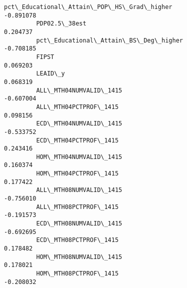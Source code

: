 \documentclass[11pt]{article}
\begin{document}
\begin{Verbatim}[commandchars=\\\{\}]
         pct\_Educational\_Attain\_POP\_HS\_Grad\_higher                    -0.891078   
         PDP02.5\_38est                                                 0.204737   
         pct\_Educational\_Attain\_BS\_Deg\_higher                         -0.708185   
         FIPST                                                         0.069203   
         LEAID\_y                                                       0.068319   
         ALL\_MTH04NUMVALID\_1415                                       -0.607004   
         ALL\_MTH04PCTPROF\_1415                                         0.098156   
         ECD\_MTH04NUMVALID\_1415                                       -0.533752   
         ECD\_MTH04PCTPROF\_1415                                         0.243416   
         HOM\_MTH04NUMVALID\_1415                                        0.160374   
         HOM\_MTH04PCTPROF\_1415                                         0.177422   
         ALL\_MTH08NUMVALID\_1415                                       -0.756010   
         ALL\_MTH08PCTPROF\_1415                                        -0.191573   
         ECD\_MTH08NUMVALID\_1415                                       -0.692695   
         ECD\_MTH08PCTPROF\_1415                                         0.178482   
         HOM\_MTH08NUMVALID\_1415                                        0.178021   
         HOM\_MTH08PCTPROF\_1415                                        -0.208032   
         

\end{Verbatim}
\end{document}
